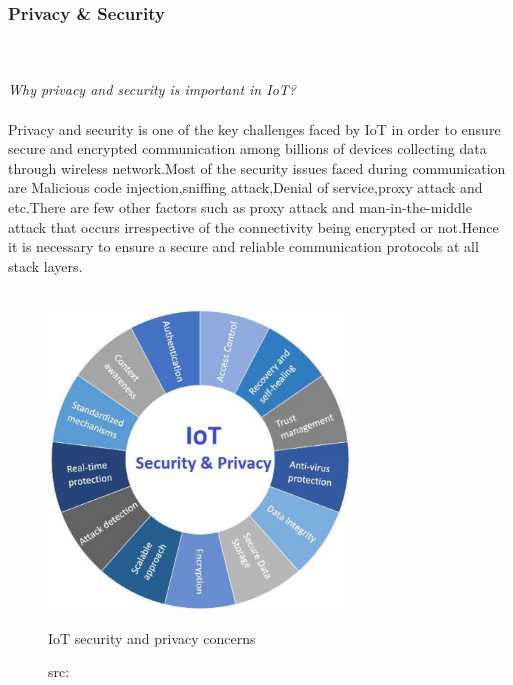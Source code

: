 \subsubsection{Privacy \& Security}
\hfill\\
\hfill\\
\emph{Why privacy and security is important in IoT?}\\ \\
Privacy and security is one of the key challenges faced by IoT in order to ensure secure and encrypted communication among billions of devices collecting data through wireless network.Most of the security issues faced during communication are Malicious code injection,sniffing attack,Denial of service,proxy attack and etc.There are few other factors such as proxy attack and man-in-the-middle attack that occurs irrespective of the connectivity being encrypted or not\cite{sec}.Hence it is necessary to ensure a secure and reliable communication protocols at all stack layers.\\ \\

\begin{figure}[H]
	\centering
	\includegraphics[width=8cm]{image/security.png}
	\caption{IoT security and privacy concerns}
	\caption*{src:\cite{sec}}
\end{figure}

